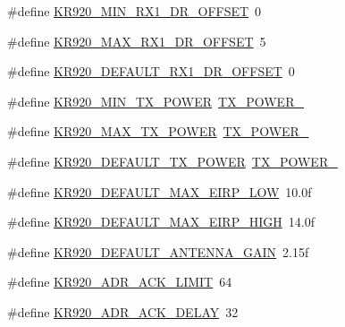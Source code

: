 \begin{DoxyCompactItemize}
\item 
\#define \mbox{\hyperlink{group___r_e_g_i_o_n_k_r920_ga908e343791acd6310a55ed1eb947ccd4}{K\+R920\+\_\+\+M\+I\+N\+\_\+\+R\+X1\+\_\+\+D\+R\+\_\+\+O\+F\+F\+S\+ET}}~0
\item 
\#define \mbox{\hyperlink{group___r_e_g_i_o_n_k_r920_ga3320f5d61b1846808a88a6d6c195a655}{K\+R920\+\_\+\+M\+A\+X\+\_\+\+R\+X1\+\_\+\+D\+R\+\_\+\+O\+F\+F\+S\+ET}}~5
\item 
\#define \mbox{\hyperlink{group___r_e_g_i_o_n_k_r920_ga5da7ad3641edddb4a2160e9c8dd927e8}{K\+R920\+\_\+\+D\+E\+F\+A\+U\+L\+T\+\_\+\+R\+X1\+\_\+\+D\+R\+\_\+\+O\+F\+F\+S\+ET}}~0
\item 
\#define \mbox{\hyperlink{group___r_e_g_i_o_n_k_r920_gab7d15217c552fe7d9acbef2e18d773a4}{K\+R920\+\_\+\+M\+I\+N\+\_\+\+T\+X\+\_\+\+P\+O\+W\+ER}}~\mbox{\hyperlink{group___r_e_g_i_o_n_ga3c7bd9a98f0c1e7e9aaa90857c4bd700}{T\+X\+\_\+\+P\+O\+W\+E\+R\+\_}}
\item 
\#define \mbox{\hyperlink{group___r_e_g_i_o_n_k_r920_ga83f7aad24311983622b179a74c3c80d0}{K\+R920\+\_\+\+M\+A\+X\+\_\+\+T\+X\+\_\+\+P\+O\+W\+ER}}~\mbox{\hyperlink{group___r_e_g_i_o_n_gab33618449f2a573142c463ab071ef8ed}{T\+X\+\_\+\+P\+O\+W\+E\+R\+\_}}
\item 
\#define \mbox{\hyperlink{group___r_e_g_i_o_n_k_r920_ga2d050aba7ed77d79eb65e2be94ca9abe}{K\+R920\+\_\+\+D\+E\+F\+A\+U\+L\+T\+\_\+\+T\+X\+\_\+\+P\+O\+W\+ER}}~\mbox{\hyperlink{group___r_e_g_i_o_n_gab33618449f2a573142c463ab071ef8ed}{T\+X\+\_\+\+P\+O\+W\+E\+R\+\_}}
\item 
\#define \mbox{\hyperlink{group___r_e_g_i_o_n_k_r920_gaa1089d31d3ed0d917ca83b1d380c0f3a}{K\+R920\+\_\+\+D\+E\+F\+A\+U\+L\+T\+\_\+\+M\+A\+X\+\_\+\+E\+I\+R\+P\+\_\+\+L\+OW}}~10.\+0f
\item 
\#define \mbox{\hyperlink{group___r_e_g_i_o_n_k_r920_ga616f9bdfacc11e6345f7fb99f0c19471}{K\+R920\+\_\+\+D\+E\+F\+A\+U\+L\+T\+\_\+\+M\+A\+X\+\_\+\+E\+I\+R\+P\+\_\+\+H\+I\+GH}}~14.\+0f
\item 
\#define \mbox{\hyperlink{group___r_e_g_i_o_n_k_r920_gae51311387812d676bdc5dea935791713}{K\+R920\+\_\+\+D\+E\+F\+A\+U\+L\+T\+\_\+\+A\+N\+T\+E\+N\+N\+A\+\_\+\+G\+A\+IN}}~2.\+15f
\item 
\#define \mbox{\hyperlink{group___r_e_g_i_o_n_k_r920_ga6950b0a2c12046467e541efc0738c58c}{K\+R920\+\_\+\+A\+D\+R\+\_\+\+A\+C\+K\+\_\+\+L\+I\+M\+IT}}~64
\item 
\#define \mbox{\hyperlink{group___r_e_g_i_o_n_k_r920_gad06060e2fefe5ba46e3015555759a088}{K\+R920\+\_\+\+A\+D\+R\+\_\+\+A\+C\+K\+\_\+\+D\+E\+L\+AY}}~32

\end{DoxyCompactItemize}

